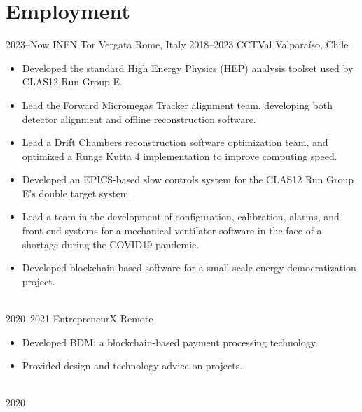 \documentclass[a4paper]{cv-style}
\begin{document}
\section{Employment}
    \begin{entrylist}
        \entry
            {2023--Now}
            {INFN Tor Vergata}
            {Rome, Italy}
            {}
        \entry
            {2018--2023}
            {CCTVal}
            {Valpara\'iso, Chile}
            {
            \begin{itemize}
                \item
                    Developed the standard High Energy Physics (HEP) analysis toolset used by CLAS12 Run Group E.
                \item
                    Lead the Forward Micromegas Tracker alignment team, developing both detector alignment and offline reconstruction software.
                \item
                    Lead a Drift Chambers reconstruction software optimization team, and optimized a Runge Kutta 4 implementation to improve computing speed.
                \item
                    Developed an EPICS-based slow controls system for the CLAS12 Run Group E's double target system.
                \item
                    Lead a team in the development of configuration, calibration, alarms, and front-end systems for a mechanical ventilator software in the face of a shortage during the COVID19 pandemic.
                \item
                    Developed blockchain-based software for a small-scale energy democratization project.
            \end{itemize}} \\
        \entry
            {2020--2021}
            {EntrepreneurX}
            {Remote}
            {
            \begin{itemize}
                \item
                    Developed BDM: a blockchain-based payment processing technology.
                \item
                    Provided design and technology advice on projects.
            \end{itemize}} \\
        \entry
            {2020}

\end{entrylist}
\end{document}
